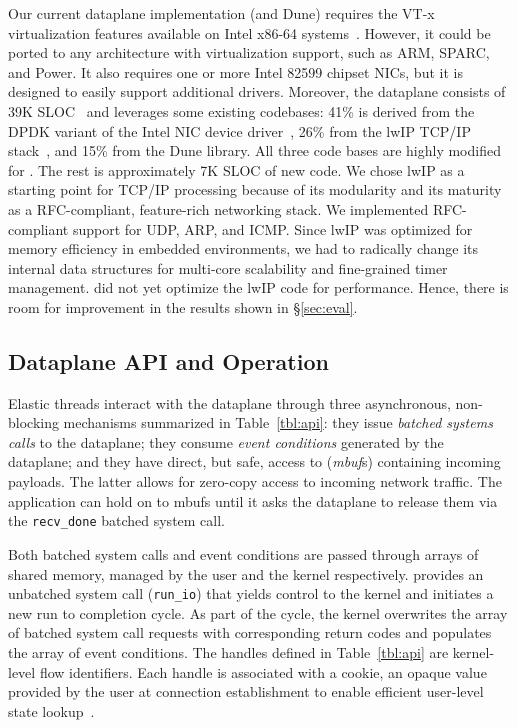 Our current \ix dataplane implementation (and Dune) requires
the VT-x virtualization features available on Intel x86-64
systems~\cite{DBLP:journals/computer/UhligNRSMABKLS05}. However, it
could be ported to any architecture with virtualization support, such as
ARM, SPARC, and Power. It also requires one or more Intel 82599 chipset NICs,
but it is designed to easily support additional drivers.
Moreover, the \ix dataplane  consists of 39K
SLOC~\cite{url:sloccount} and leverages some existing codebases:
41\% is derived from
the DPDK variant of the Intel NIC device driver~\cite{intel:dpdk},
26\% from the lwIP TCP/IP stack~\cite{dunkels2001design},
and 15\% from the Dune library.  All three code bases are
highly modified for \ix. The rest is approximately 7K SLOC
of new code. We chose lwIP as a starting point for TCP/IP processing
because of its modularity and its maturity as a RFC-compliant,
feature-rich networking stack. We implemented RFC-compliant support
for UDP, ARP, and ICMP.  Since lwIP was optimized for memory
efficiency in embedded environments, we had to radically change its
internal data structures for multi-core scalability and fine-grained
timer management.  did not yet optimize the lwIP code for
performance. Hence, there is room for improvement in the results shown
in \S\ref{sec:eval}.

\subsection{Dataplane API and Operation}
\label{sec:impl:api}

Elastic threads interact with the \ix dataplane through three
asynchronous, non-blocking mechanisms summarized in
Table~\ref{tbl:api}: they issue \emph{batched systems calls} to the
dataplane; they consume \emph{event conditions} generated by the
dataplane; and they have direct, but safe, access to (\emph{mbuf}s)
containing incoming payloads.  The latter allows for zero-copy access
to incoming network traffic.  The application can hold on to mbufs
until it asks the dataplane to release them via the
\texttt{recv\_done} batched system call.

Both batched system calls and event conditions are passed through
arrays of shared memory, managed by the user and the kernel
respectively.  \ix provides an unbatched system call
(\texttt{run\_io}) that yields control to the kernel and initiates a
new run to completion cycle. As part of the cycle, the kernel
overwrites the array of batched system call requests with
corresponding return codes and populates the array of event
conditions.  The handles defined in Table~\ref{tbl:api} are
kernel-level flow identifiers. Each handle is associated with a
cookie, an opaque value provided by the user at connection
establishment to enable efficient user-level state
lookup~\cite{DBLP:conf/osdi/HanMCR12}. %

